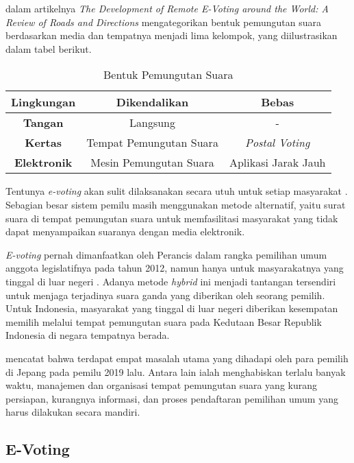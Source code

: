 \documentclass[12pt, a4paper, final]{article}
\begin{document}
\cite{review1} dalam artikelnya \textit{The Development of Remote E-Voting around the World:  A Review of Roads and Directions} mengategorikan bentuk pemungutan suara berdasarkan media dan tempatnya menjadi lima kelompok, yang diilustrasikan dalam tabel berikut.

\begin{table}[h]
\centering
\begin{tabular}{|c|c|c|}
\hline
\textbf{Lingkungan} & \textbf{Dikendalikan}   & \textbf{Bebas}      \\ \hline
\textbf{Tangan}     & Langsung                & -                   \\ \hline
\textbf{Kertas}     & Tempat Pemungutan Suara & \textit{Postal Voting}     \\ \hline
\textbf{Elektronik} & Mesin Pemungutan Suara  & Aplikasi Jarak Jauh \\ \hline
\end{tabular}
\caption{Bentuk Pemungutan Suara}
\end{table}

Tentunya \textit{e-voting} akan sulit dilaksanakan secara utuh untuk setiap masyarakat \citep{7001136}. Sebagian besar sistem pemilu masih menggunakan metode alternatif, yaitu surat suara di tempat pemungutan suara untuk memfasilitasi masyarakat yang tidak dapat menyampaikan suaranya dengan media elektronik.

\textit{E-voting} pernah dimanfaatkan oleh Perancis dalam rangka pemilihan umum anggota legislatifnya pada tahun 2012, namun hanya untuk masyarakatnya yang tinggal di luar negeri \citep{france}. Adanya metode \textit{hybrid} ini menjadi tantangan tersendiri untuk menjaga terjadinya suara ganda yang diberikan oleh seorang pemilih. Untuk Indonesia, masyarakat yang tinggal di luar negeri diberikan kesempatan memilih melalui tempat pemungutan suara pada Kedutaan Besar Republik Indonesia di negara tempatnya berada.

\cite{Pujiatin_2021} mencatat bahwa terdapat empat masalah utama yang dihadapi oleh para pemilih di Jepang pada pemilu 2019 lalu. Antara lain ialah menghabiskan terlalu banyak waktu, manajemen dan organisasi tempat pemungutan suara yang kurang persiapan, kurangnya informasi, dan proses pendaftaran pemilihan umum yang harus dilakukan secara mandiri.

\subsection{E-Voting}
\end{document}
